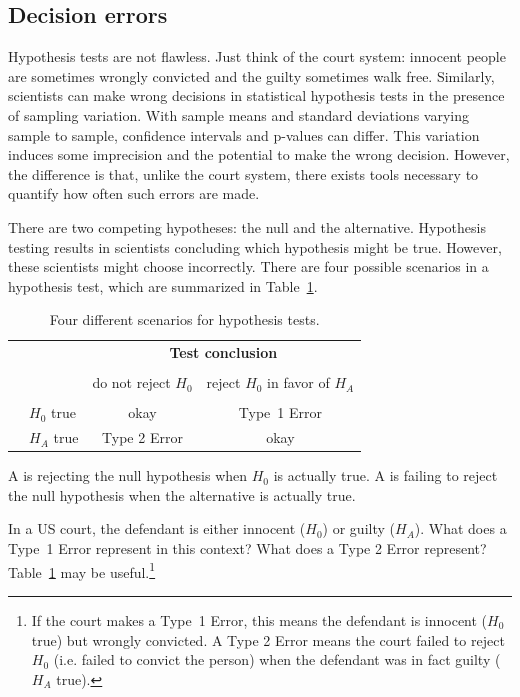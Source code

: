 \subsection{Decision errors}\label{DecisionErrors}


Hypothesis tests are not flawless. Just think of the court system: innocent people are sometimes wrongly convicted and the guilty sometimes walk free. Similarly, scientists can make wrong decisions in statistical hypothesis tests in the presence of sampling variation. With sample means and standard deviations varying sample to sample, confidence intervals and p-values can differ. This variation induces some imprecision and the potential to make the wrong decision. However, the difference is that, unlike the court system, there exists tools necessary to quantify how often such errors are made.

There are two competing hypotheses: the null and the alternative. Hypothesis testing results in scientists concluding which hypothesis might be true. However, these scientists might choose incorrectly. There are four possible scenarios in a hypothesis test, which are summarized in Table~\ref{fourHTScenarios}.

\begin{table}[ht]
\centering
\begin{tabular}{l l c c}
& & \multicolumn{2}{c}{\textbf{Test conclusion}} \\
  \cline{3-4}
\vspace{-3.7mm} \\
& & do not reject $H_0$ &  reject $H_0$ in favor of $H_A$ \\
  \cline{2-4}
\vspace{-3.7mm} \\
& $H_0$ true & okay &  Type~1 Error \\
\raisebox{1.5ex}{\textbf{Truth}} & $H_A$ true & Type 2 Error & okay \\
  \cline{2-4}
\end{tabular}
\caption{Four different scenarios for hypothesis tests.}
\label{fourHTScenarios}
\end{table}

A  is rejecting the null hypothesis when $H_0$ is actually true. A  is failing to reject the null hypothesis when the alternative is actually true.

\begin{exercise} \label{whatAreTheErrorTypesInUSCourts}
In a US court, the defendant is either innocent ($H_0$) or  guilty ($H_A$). What does a Type~1 Error represent in this context? What does a Type 2 Error represent? Table~\ref{fourHTScenarios} may be useful.\footnote{If the court makes a Type~1 Error, this means the defendant is innocent ($H_0$ true) but wrongly convicted. A Type 2 Error means the court failed to reject $H_0$ (i.e. failed to convict the person) when the defendant was in fact guilty ($H_A$ true).}
\end{exercise}

